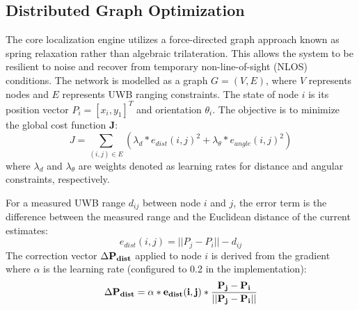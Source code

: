 
\subsection{Distributed Graph Optimization}
\noindent The core localization engine utilizes a force-directed graph approach known as spring relaxation rather than algebraic trilateration. This allows the system to be resilient to noise and recover from temporary non-line-of-sight (NLOS) conditions. The network is modelled as a graph $G = (V, E)$, where $V$ represents nodes and $E$ represents UWB ranging constraints. The state of node $i$ is its position vector \textbf{$P_i = [x_i, y_1]^T$} and orientation \textbf{$\theta_i$}. The objective is to minimize the global cost function \textbf{J}:
\begin{equation}
    J = \sum_{(i,j) \in E} (\lambda_d * e_{dist}(i,j)^2 + \lambda_\theta * e_{angle}(i,j)^2)
\end{equation}
where $\lambda_d$ and $\lambda_\theta$ are weights denoted as learning rates for distance and angular constraints, respectively.

\noindent For a measured UWB range $d_{ij}$ between node $i$ and $j$, the error term is the difference between the measured range and the Euclidean distance of the current estimates:
\begin{equation}
    e_{dist}(i,j) = || P_j - P_i || - d_{ij}
\end{equation}
The correction vector $\Delta\bf{P}_{dist}$ applied to node $i$ is derived from the gradient where $\alpha$ is the learning rate (configured to 0.2 in the implementation):
\begin{equation}
    \Delta\bf{P}_{dist} = \alpha * e_{dist}(i,j) * \frac{P_j - P_i}{|| P_j - P_i ||}
\end{equation}
